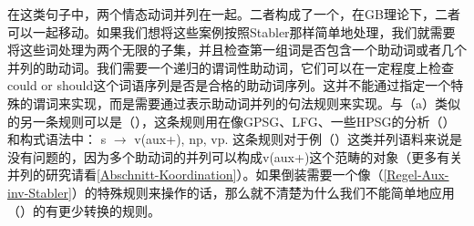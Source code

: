 \z
在这类句子中，两个情态动词并列在一起。二者构成了一个\xzeroc，在GB理论下，二者可以一起移动。如果我们想将这些案例按照Stabler那样简单地处理，我们就需要将这些词处理为两个无限的子集，并且检查第一组词是否包含一个助动词或者几个并列的助动词。我们需要一个递归的谓词性助动词，它们可以在一定程度上检查could or should这个词语序列是否是合格的助动词序列。这并不能通过指定一个特殊的谓词来实现，而是需要通过表示助动词并列的句法规则来实现。与（a）类似的另一条规则可以是（），这条规则用在像GPSG\citep[]{GKPS85a}、LFG\citep[]{Falk84a-u}、一些HPSG的分析（\citealp[]{GSag2000a-u}）和构式语法中\citep{Fillmore99a}：
\ea
s $\to$ v(aux+), np, vp.
\z
这条规则对于例（）这类并列语料来说是没有问题的，因为多个助动词的并列可以构成v(aux+)这个范畴的对象（更多有关并列的研究请看\ref{Abschnitt-Koordination}）。如果倒装需要一个像（\ref{Regel-Aux-inv-Stabler}）的特殊规则来操作的话，那么就不清楚为什么我们不能简单地应用（）的有更少转换的规则。

